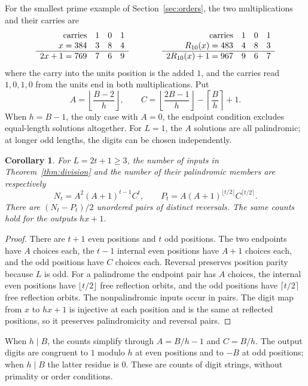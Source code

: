 \documentclass[11pt]{amsart}
\newtheorem{corollary}[theorem]{Corollary}
\theoremstyle{remark}\newtheorem{remark}[theorem]{Remark}
\begin{document}
For the smallest prime example of Section~\ref{sec:orders}, the two multiplications and their carries are
\[
\begin{array}{r@{\quad}ccc}
 \text{carries}&1&0&1\\
 x=384&3&8&4\\ \hline
 2x+1=769&7&6&9
\end{array}
\qquad\qquad
\begin{array}{r@{\quad}ccc}
 \text{carries}&1&0&1\\
 R_{10}(x)=483&4&8&3\\ \hline
 2R_{10}(x)+1=967&9&6&7
\end{array}
\]
where the carry into the units position is the added $1$, and the carries read $1,0,1,0$ from the units end in both multiplications. Put
\[
 A=\left\lfloor\frac{B-2}{h}\right\rfloor,\qquad
 C=\left\lfloor\frac{2B-1}{h}\right\rfloor-\left\lceil\frac Bh\right\rceil+1.
\]
When $h=B-1$, the only case with $A=0$, the endpoint condition excludes equal-length solutions altogether. For $L=1$, the $A$ solutions are all palindromic; at longer odd lengths, the digits can be chosen independently.

\begin{corollary}\label{cor:counts}
For $L=2t+1\ge3$, the number of inputs in Theorem~\ref{thm:division} and the number of their palindromic members are respectively
\begin{equation}\label{eq:counts}
 N_t=A^2(A+1)^{t-1}C^t,\qquad
 P_t=A(A+1)^{\lfloor t/2\rfloor}C^{\lceil t/2\rceil}.
\end{equation}
There are $(N_t-P_t)/2$ unordered pairs of distinct reversals.
The same counts hold for the outputs $hx+1$.
\end{corollary}
\begin{proof}
There are $t+1$ even positions and $t$ odd positions.
The two endpoints have $A$ choices each, the $t-1$ internal even positions have $A+1$ choices each, and the odd positions have $C$ choices each.
Reversal preserves position parity because $L$ is odd. For a palindrome the endpoint pair has $A$ choices, the internal even positions have $\lfloor t/2\rfloor$ free reflection orbits, and the odd positions have $\lceil t/2\rceil$ free reflection orbits.
The nonpalindromic inputs occur in pairs.
The digit map from $x$ to $hx+1$ is injective at each position and is the same at reflected positions, so it preserves palindromicity and reversal pairs.
\end{proof}

When $h\mid B$, the counts simplify through $A=B/h-1$ and $C=B/h$. The output digits are congruent to $1$ modulo $h$ at even positions and to $-B$ at odd positions; when $h\mid B$ the latter residue is $0$. These are counts of digit strings, without primality or order conditions.
\end{document}
